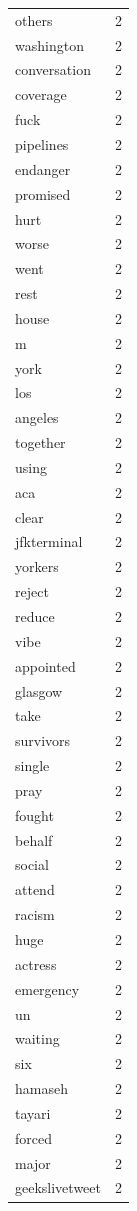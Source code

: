 \begin{tabular}{lr}
others & 2 \\
washington & 2 \\
conversation & 2 \\
coverage & 2 \\
fuck & 2 \\
pipelines & 2 \\
endanger & 2 \\
promised & 2 \\
hurt & 2 \\
worse & 2 \\
went & 2 \\
rest & 2 \\
house & 2 \\
m & 2 \\
york & 2 \\
los & 2 \\
angeles & 2 \\
together & 2 \\
using & 2 \\
aca & 2 \\
clear & 2 \\
jfkterminal & 2 \\
yorkers & 2 \\
reject & 2 \\
reduce & 2 \\
vibe & 2 \\
appointed & 2 \\
glasgow & 2 \\
take & 2 \\
survivors & 2 \\
single & 2 \\
pray & 2 \\
fought & 2 \\
behalf & 2 \\
social & 2 \\
attend & 2 \\
racism & 2 \\
huge & 2 \\
actress & 2 \\
emergency & 2 \\
un & 2 \\
waiting & 2 \\
six & 2 \\
hamaseh & 2 \\
tayari & 2 \\
forced & 2 \\
major & 2 \\
geekslivetweet & 2 \\

\end{tabular}
